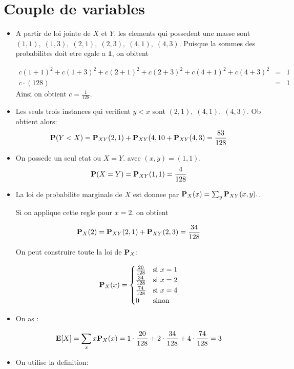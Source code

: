 \documentclass[a4paper]{tufte-handout}
\newcommand{\E}{\mathbf{E}}
\begin{document}
\section{Couple de variables}

\begin{itemize}
  \item A partir de loi jointe de $X$ et $Y$, les elements qui possedent une
    masse sont $(1,1),\; (1,3),\; (2,1),\; (2,3),\; (4,1),\; (4,3)$. Puisque la
    sommes des probabilites doit etre egale a $\mathbf{1}$, on obitent

    \begin{eqnarray*}
      c(1+1)^2 +  c(1+3)^2 + c(2+1)^2 + c(2+3)^2 +  c(4+1)^2 + c(4+3)^2 &=& 1\\
      c\cdot(128) & = & 1
    \end{eqnarray*}
    Ainsi on obtient $c = \frac{1}{128}$.
  \item Les seuls trois instances qui verifient $y < x$ sont $(2,1),\; (4,1),\;
    (4,3)$.
    Ob obtient alors:
    $$
    \P(Y < X) = \P_{XY}(2,1) + \P_{XY}(4,10 + \P_{XY}(4,3) = \frac{83}{128}
    $$
    
  \item On possede un seul etat ou $X = Y$. avec $(x,y) = (1,1)$.
    $$
    \P(X = Y) = \P_{XY}(1,1) = \frac{4}{128}
    $$

  \item La loi de probabilite marginale de $X$ est donnee par $\P_X(x) = \sum_y
    \P_{XY}(x,y).$. 

    Si on applique cette regle pour $x=2$. on obtient

    $$
    \P_X(2) = \P_{XY}(2,1) + \P_{XY}(2,3) = \frac{34}{128}
    $$

    On peut construire toute la loi de $\P_X$:

    $$
    \P_X(x) = \begin{cases}
      \frac{20}{128}   & \text{si } x =1\\
      \frac{34}{128}   & \text{si } x =2\\
      \frac{74}{128}   & \text{si } x =4\\
      0    & \text{sinon } \\

    \end{cases}
    $$
  \item On as :

    $$
    \E[X] = \sum_x x\P_X(x) = 1\cdot \frac{20}{128} + 2\cdot \frac{34}{128} +
4\cdot \frac{74}{128} = 3
    $$
  \item On utilise la definition:


\end{itemize}
\end{document}
